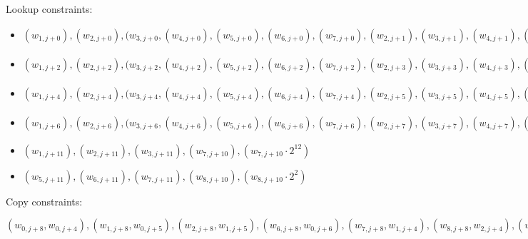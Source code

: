 Lookup constraints:
\begin{itemize}
\item $(w_{1, j + 0}), (w_{2, j + 0}), (w_{3, j + 0}, (w_{4, j + 0}), (w_{5, j + 0}), (w_{6, j + 0}), (w_{7, j + 0}), (w_{2, j + 1}), (w_{3, j + 1}), (w_{4, j + 1}), (w_{5, j + 1}), (w_{6, j + 1}), (w_{7, j + 1}, w_{8, j + 1}), (w_{7, j + 1} \cdot 2^{5})$
\item $(w_{1, j + 2}), (w_{2, j + 2}), (w_{3, j + 2}, (w_{4, j + 2}), (w_{5, j + 2}), (w_{6, j + 2}), (w_{7, j + 2}), (w_{2, j + 3}), (w_{3, j + 3}), (w_{4, j + 3}), (w_{5, j + 3}), (w_{6, j + 3}), (w_{7, j + 3}, w_{8, j + 3}), (w_{7, j + 3} \cdot 2^{5})$
\item $(w_{1, j + 4}), (w_{2, j + 4}), (w_{3, j + 4}, (w_{4, j + 4}), (w_{5, j + 4}), (w_{6, j + 4}), (w_{7, j + 4}), (w_{2, j + 5}), (w_{3, j + 5}), (w_{4, j + 5}), (w_{5, j + 5}), (w_{6, j + 5}), (w_{7, j + 5}, w_{8, j + 5}), (w_{7, j + 5} \cdot 2^{5})$
\item $(w_{1, j + 6}), (w_{2, j + 6}), (w_{3, j + 6}, (w_{4, j + 6}), (w_{5, j + 6}), (w_{6, j + 6}), (w_{7, j + 6}), (w_{2, j + 7}), (w_{3, j + 7}), (w_{4, j + 7}), (w_{5, j + 7}), (w_{6, j + 7}), (w_{7, j + 7}, w_{8, j + 7}), (w_{7, j + 7} \cdot 2^{5})$
\item $(w_{1, j + 11}), (w_{2, j + 11}), (w_{3, j + 11}), (w_{7, j + 10}), (w_{7, j + 10} \cdot 2^{12})$
\item $(w_{5, j + 11}), (w_{6, j + 11}), (w_{7, j + 11}), (w_{8, j + 10}), (w_{8, j + 10} \cdot 2^{2})$
\end{itemize}

Copy constraints:
\begin{center}
$(w_{0, j + 8}, w_{0, j + 4}), (w_{1, j + 8}, w_{0, j + 5}), (w_{2, j + 8}, w_{1, j + 5}), (w_{6, j + 8}, w_{0, j + 6}), (w_{7, j + 8}, w_{1, j + 4}), (w_{8, j + 8}, w_{2, j + 4}), (w_{0, j + 9}, w_{0, j + 3}), (w_{1, j + 9}, w_{1, j + 3}), (w_{2, j + 9}, w_{3, j + 4}), (w_{3, j + 9}, w_{1, j + 2}), (w_{4, j + 9}, w_{2, j + 2}), (w_{5, j + 9}, w_{3, j + 2}), (w_{7, j + 9}, w_{0, j + 11}), (w_{8, j + 9}, w_{4, j + 11}), (w_{0, j + 10}, w_{0, j + 0}), (w_{1, j + 10}, w_{0, j + 1}), (w_{2, j + 10}, w_{1, j + 1}), (w_{3, j + 10}, w_{0, j + 2}), (w_{4, j + 10}, w_{1, j + 0}), (w_{5, j + 10}, w_{2, j + 0}), (w_{6, j + 10}, w_{3, j + 0})$
\end{center}

